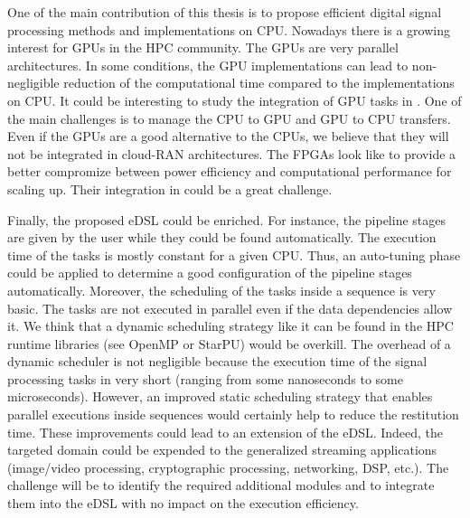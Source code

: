 One of the main contribution of this thesis is to propose efficient digital
signal processing methods and implementations on CPU. Nowadays there is a
growing interest for GPUs in the HPC community. The GPUs are very parallel
architectures. In some conditions, the GPU implementations can lead to
non-negligible reduction of the computational time compared to the
implementations on CPU. It could be interesting to study the integration of
GPU tasks in \AFFECT. One of the main challenges is to manage the CPU to GPU and
GPU to CPU transfers. Even if the GPUs are a good alternative to the CPUs, we
believe that they will not be integrated in cloud-RAN architectures. The FPGAs
look like to provide a better compromize between power efficiency and
computational performance for scaling up. Their integration in \AFFECT could be
a great challenge.

Finally, the proposed eDSL could be enriched. For instance, the pipeline stages
are given by the user while they could be found automatically. The execution
time of the tasks is mostly constant for a given CPU. Thus, an auto-tuning phase
could be applied to determine a good configuration of the pipeline stages
automatically. Moreover, the scheduling of the tasks inside a sequence is very
basic. The tasks are not executed in parallel even if the data dependencies
allow it. We think that a dynamic scheduling strategy like it can be found in
the HPC runtime libraries (see OpenMP or StarPU) would be overkill. The overhead
of a dynamic scheduler is not negligible because the execution time of the
signal processing tasks in very short (ranging from some nanoseconds to some
microseconds). However, an improved static scheduling strategy that enables
parallel executions inside sequences would certainly help to reduce the
restitution time. These improvements could lead to an extension of the \AFFECT
eDSL. Indeed, the targeted domain could be expended to the generalized streaming
applications (image/video processing, cryptographic processing, networking, DSP,
etc.). The challenge will be to identify the required additional modules and to
integrate them into the eDSL with no impact on the execution efficiency.
